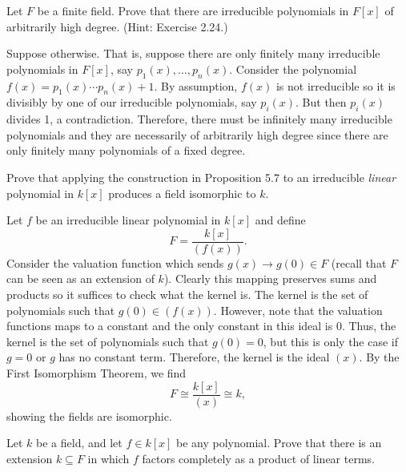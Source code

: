 \documentclass[../../master.tex]{subfiles}
\begin{document}
\begin{problem}
    Let $F$ be a finite field.
    Prove that there are irreducible polynomials in $F[x]$ of arbitrarily high degree.
    (Hint: Exercise 2.24.)
\end{problem}

\begin{solution}
    Suppose otherwise.
    That is, suppose there are only finitely many irreducible polynomials in $F[x]$, say $p_1(x), \ldots, p_n(x)$.
    Consider the polynomial $f(x) = p_1(x) \cdots p_n(x) + 1$.
    By assumption, $f(x)$ is not irreducible so it is divisibly by one of our irreducible polynomials, say $p_i(x)$.
    But then $p_i(x)$ divides 1, a contradiction.
    Therefore, there must be infinitely many irreducible polynomials and they are necessarily of arbitrarily high degree since there are only finitely many polynomials of a fixed degree.
\end{solution}

\begin{problem}
    Prove that applying the construction in Proposition 5.7 to an irreducible \textit{linear} polynomial in $k[x]$ produces a field isomorphic to $k$.
\end{problem}

\begin{solution}
    Let $f$ be an irreducible linear polynomial in $k[x]$ and define
    \[
        F = \frac{k[x]}{(f(x))}.
    \]
    Consider the valuation function which sends $g(x) \to g(0) \in F$ (recall that $F$ can be seen as an extension of $k$).
    Clearly this mapping preserves sums and products so it suffices to check what the kernel is.
    The kernel is the set of polynomials such that $g(0) \in (f(x))$. 
    However, note that the valuation functions maps to a constant and the only constant in this ideal is 0.
    Thus, the kernel is the set of polynomials such that $g(0) = 0$, but this is only the case if $g = 0$ or $g$ has no constant term.
    Therefore, the kernel is the ideal $(x)$.
    By the First Isomorphism Theorem, we find
    \[
        F \cong \frac{k[x]}{(x)} \cong k,
    \]
    showing the fields are isomorphic.
\end{solution}

\begin{problem}
    Let $k$ be a field, and let $f \in k[x]$ be any polynomial.
    Prove that there is an extension $k \subseteq F$ in which $f$ factors completely as a product of linear terms.
\end{problem}
\end{document}
